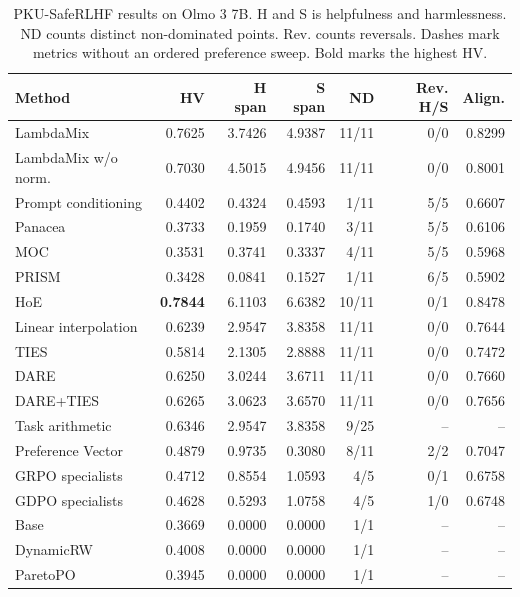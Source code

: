 \begin{table}[htbp]
\centering\small
\setlength{\tabcolsep}{3pt}
\caption{PKU-SafeRLHF results on Olmo 3 7B. H and S is helpfulness and harmlessness. ND counts distinct non-dominated points. Rev. counts reversals. Dashes mark metrics without an ordered preference sweep. Bold marks the highest HV.}
\label{tab:full-pku-o7}
\begin{tabular}{@{}lrrrrrr@{}}
\toprule
Method & HV & H span & S span & ND & Rev. H/S & Align.\\
\midrule
LambdaMix & 0.7625 & 3.7426 & 4.9387 & 11/11 & 0/0 & 0.8299\\
LambdaMix w/o norm. & 0.7030 & 4.5015 & 4.9456 & 11/11 & 0/0 & 0.8001\\
\midrule
Prompt conditioning & 0.4402 & 0.4324 & 0.4593 & 1/11 & 5/5 & 0.6607\\
Panacea & 0.3733 & 0.1959 & 0.1740 & 3/11 & 5/5 & 0.6106\\
MOC & 0.3531 & 0.3741 & 0.3337 & 4/11 & 5/5 & 0.5968\\
PRISM & 0.3428 & 0.0841 & 0.1527 & 1/11 & 6/5 & 0.5902\\
HoE & \textbf{0.7844} & 6.1103 & 6.6382 & 10/11 & 0/1 & 0.8478\\
\midrule
Linear interpolation & 0.6239 & 2.9547 & 3.8358 & 11/11 & 0/0 & 0.7644\\
TIES & 0.5814 & 2.1305 & 2.8888 & 11/11 & 0/0 & 0.7472\\
DARE & 0.6250 & 3.0244 & 3.6711 & 11/11 & 0/0 & 0.7660\\
DARE+TIES & 0.6265 & 3.0623 & 3.6570 & 11/11 & 0/0 & 0.7656\\
Task arithmetic & 0.6346 & 2.9547 & 3.8358 & 9/25 & -- & --\\
Preference Vector & 0.4879 & 0.9735 & 0.3080 & 8/11 & 2/2 & 0.7047\\
\midrule
GRPO specialists & 0.4712 & 0.8554 & 1.0593 & 4/5 & 0/1 & 0.6758\\
GDPO specialists & 0.4628 & 0.5293 & 1.0758 & 4/5 & 1/0 & 0.6748\\
\midrule
Base & 0.3669 & 0.0000 & 0.0000 & 1/1 & -- & --\\
DynamicRW & 0.4008 & 0.0000 & 0.0000 & 1/1 & -- & --\\
ParetoPO & 0.3945 & 0.0000 & 0.0000 & 1/1 & -- & --\\
\bottomrule
\end{tabular}
\end{table}

